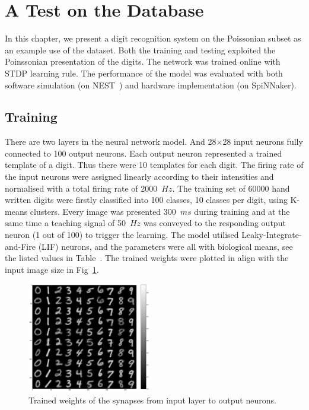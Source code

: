 \section{A Test on the Database}
\label{sec:test}
In this chapter, we present a digit recognition system on the Poissonian subset as an example use of the dataset.
Both the training and testing exploited the Poinssonian presentation of the digits.
The network was trained online with STDP learning rule.
The performance of the model was evaluated with both software simulation (on NEST~\cite{gewaltig2007nest}) and hardware implementation (on SpiNNaker). 
\subsection{Training}
There are two layers in the neural network model.
And 28$\times$28 input neurons fully connected to 100 output neurons.
Each output neuron represented a trained template of a digit.
Thus there were 10 templates for each digit.
The firing rate of the input neurons were assigned linearly according to their intensities and normalised with a total firing rate of 2000~$Hz$.
The training set of 60000 hand written digits were firstly classified into 100 classes, 10 classes per digit, using K-means clusters.
Every image was presented 300~$ms$ during training and at the same time a teaching signal of 50~$Hz$ was conveyed to the responding output neuron (1 out of 100) to trigger the learning.
The model utilised Leaky-Integrate-and-Fire (LIF) neurons, and the parameters were all with biological means, see the listed values in Table~.
The trained weights were plotted in align with the input image size in Fig~\ref{Fig:weight}.
\begin{figure}[hbt!]
	\centering
	\includegraphics[width=0.48\textwidth]{images/weight.pdf}
	\caption{Trained weights of the synapses from input layer to output neurons.}
	\label{Fig:weight}
\end{figure}  
 
